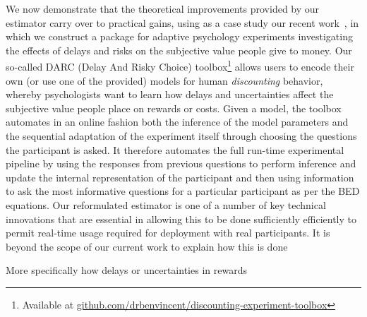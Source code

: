 We now demonstrate that the theoretical improvements provided by our estimator carry over
to practical gains, using as a case study our recent work~\cite{vincent2017darc}, in which we
construct a package for adaptive psychology experiments investigating the effects of
delays and risks on the subjective value people give to money. Our so-called DARC (Delay And Risky Choice)
toolbox\footnote{Available at \url{github.com/drbenvincent/discounting-experiment-toolbox}} allows users 
to encode their own (or use one of the provided) models for human \emph{discounting} behavior,
whereby psychologists want to learn how delays and uncertainties affect the subjective value people place
on rewards or costs. Given a model, the toolbox automates in an online fashion 
both the inference of the model parameters and the sequential adaptation of the experiment itself through
choosing the questions the participant is asked.  It therefore automates the full run-time experimental 
pipeline  by using the responses from previous questions to perform inference 
and update the internal representation
of the participant and then using information to ask the most informative questions for a particular
participant as per the BED equations.  Our reformulated estimator is one of a number of key technical
innovations that are essential in allowing this to be done sufficiently efficiently to permit
real-time usage required for deployment with real participants.  It is beyond the scope of our current
work to explain how this is done 

More specifically how delays or uncertainties in rewards 


